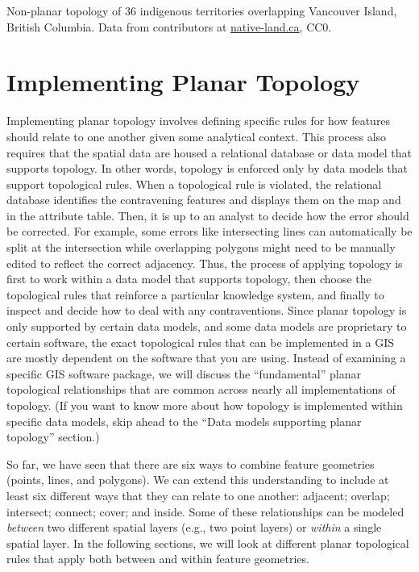 \documentclass[
]{book}
\begin{document}
\label{fig:7-native-land-leaflet}Non-planar topology of 36 indigenous territories overlapping Vancouver Island, British Columbia. Data from contributors at \href{https://native-land.ca/}{native-land.ca}, CC0.

\hypertarget{implementing-planar-topology}{%
\section{Implementing Planar Topology}\label{implementing-planar-topology}}

Implementing planar topology involves defining specific rules for how features should relate to one another given some analytical context. This process also requires that the spatial data are housed a relational database or data model that supports topology. In other words, topology is enforced only by data models that support topological rules. When a topological rule is violated, the relational database identifies the contravening features and displays them on the map and in the attribute table. Then, it is up to an analyst to decide how the error should be corrected. For example, some errors like intersecting lines can automatically be split at the intersection while overlapping polygons might need to be manually edited to reflect the correct adjacency. Thus, the process of applying topology is first to work within a data model that supports topology, then choose the topological rules that reinforce a particular knowledge system, and finally to inspect and decide how to deal with any contraventions. Since planar topology is only supported by certain data models, and some data models are proprietary to certain software, the exact topological rules that can be implemented in a GIS are mostly dependent on the software that you are using. Instead of examining a specific GIS software package, we will discuss the ``fundamental'' planar topological relationships that are common across nearly all implementations of topology. (If you want to know more about how topology is implemented within specific data models, skip ahead to the ``Data models supporting planar topology'' section.)

So far, we have seen that there are six ways to combine feature geometries (points, lines, and polygons). We can extend this understanding to include at least six different ways that they can relate to one another: adjacent; overlap; intersect; connect; cover; and inside. Some of these relationships can be modeled \emph{between} two different spatial layers (e.g., two point layers) or \emph{within} a single spatial layer. In the following sections, we will look at different planar topological rules that apply both between and within feature geometries.
\end{document}
